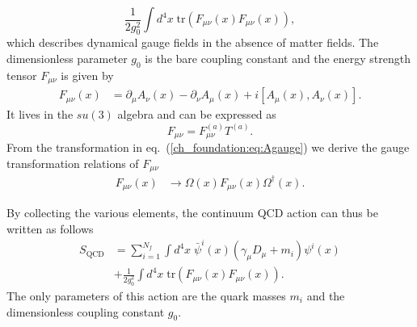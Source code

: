\begin{equation}
\label{ch_foundation:eq:SYM}
\frac{1}{2g_0^2}\int d^4x\;\textrm{tr}(F_{\mu\nu}(x)F_{\mu\nu}(x)),
\end{equation}
which describes dynamical gauge fields in the absence of matter fields. The dimensionless parameter $g_0$ is the bare coupling constant and the energy strength tensor $F_{\mu\nu}$ is given by
\begin{align}
F_{\mu\nu}(x)&=\partial_{\mu}A_{\nu}(x)-\partial_{\nu}A_{\mu}(x)+i\left[A_{\mu}(x),A_{\nu}(x)\right].
\end{align}
It lives in the $su(3)$ algebra and can be expressed as
\begin{equation}
F_{\mu\nu}=F_{\mu\nu}^{(a)}T^{(a)}.
\end{equation}
From the transformation in eq.~(\ref{ch_foundation:eq:Agauge}) we derive the gauge transformation relations of $F_{\mu\nu}$
\begin{align}
F_{\mu\nu}(x)&\to\Omega(x)F_{\mu\nu}(x)\Omega^{\dagger}(x).
\end{align}

By collecting the various elements, the continuum QCD action can thus be written as follows
\begin{align}
\label{ch_foundation:eq:QCD}
S_{\textrm{QCD}}&=\sum_{i=1}^{N_f}\int d^4x\;\bar{\psi}^i(x)\left(\gamma_{\mu}D_{\mu}+m_i\right)\psi^i(x) \\
&+\frac{1}{2g_0^2}\int d^4x\;{\textrm{tr}}\left(F_{\mu\nu}(x)F_{\mu\nu}(x)\right).
\end{align}
The only parameters of this action are the quark masses $m_i$ and the dimensionless coupling constant $g_0$.

